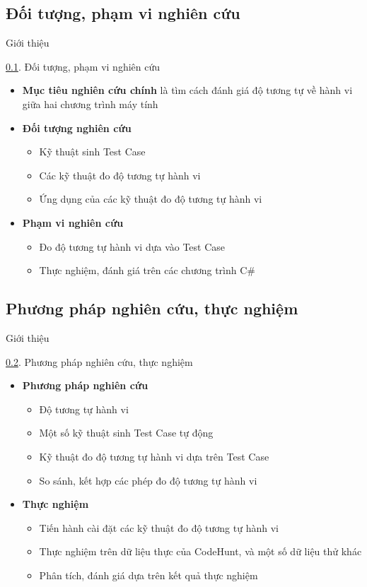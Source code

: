 \subsection{Đối tượng, phạm vi nghiên cứu}
\label{subsec:DTPVNC}
\begin{frame}{Giới thiệu}
\begin{block}{\ref{subsec:DTPVNC}. Đối tượng, phạm vi nghiên cứu }
\begin{itemize}
	\item \textbf{Mục tiêu nghiên cứu chính} là tìm cách đánh giá độ tương
	tự về hành vi giữa hai chương trình máy tính 
	\pause
	\item \textbf{Đối tượng nghiên cứu}
	\begin{itemize}
		\item Kỹ thuật sinh Test Case
		\item Các kỹ thuật đo độ tương tự hành vi
		\item Ứng dụng của các kỹ thuật đo độ tương tự hành vi
	\end{itemize}%
	\pause			
	\item \textbf{Phạm vi nghiên cứu}
	\begin{itemize}
		\item  Đo độ tương tự hành vi dựa vào Test Case
		\item Thực nghiệm, đánh giá trên các chương trình C\#
	\end{itemize}
\end{itemize}
\end{block}
\end{frame}

\subsection{Phương pháp nghiên cứu, thực nghiệm}
\label{subsec:PPNCTN}
\begin{frame}{Giới thiệu}
\begin{block}{\ref{subsec:PPNCTN}. Phương pháp nghiên cứu, thực nghiệm}
\begin{itemize}
	\item \textbf{Phương pháp nghiên cứu}
	\begin{itemize}
		\item Độ tương tự hành vi
		\item Một số kỹ thuật sinh Test Case tự động
		\item Kỹ thuật đo độ tương tự hành vi dựa trên Test Case
		\item So sánh, kết hợp các phép đo độ tương tự hành vi
	\end{itemize}		
	\pause
	\item \textbf{Thực nghiệm}
	\begin{itemize}
		\item Tiến hành cài đặt các kỹ thuật đo độ tương tự hành vi
		\item Thực nghiệm trên dữ liệu thực của CodeHunt, và một số dữ liệu thử khác
		\item Phân tích, đánh giá dựa trên kết quả thực nghiệm
	\end{itemize}		
\end{itemize}
\end{block}
\end{frame}

